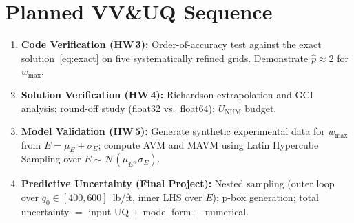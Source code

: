 \documentclass[11pt,letterpaper]{article}
\begin{document}
\section{Planned VV\&UQ Sequence}
\label{sec:plan}

\begin{enumerate}
  \item \textbf{Code Verification (HW\,3):} Order-of-accuracy test against the
    exact solution~\eqref{eq:exact} on five systematically refined grids.
    Demonstrate $\hat{p} \approx 2$ for $w_{\max}$.
  \item \textbf{Solution Verification (HW\,4):} Richardson extrapolation and GCI
    analysis; round-off study (float32 vs.\ float64); $U_{\mathrm{NUM}}$ budget.
  \item \textbf{Model Validation (HW\,5):} Generate synthetic experimental data
    for $w_{\max}$ from $E = \mu_E \pm \sigma_E$; compute AVM and MAVM using
    Latin Hypercube Sampling over $E \sim \mathcal{N}(\mu_E, \sigma_E)$.
  \item \textbf{Predictive Uncertainty (Final Project):} Nested sampling (outer
    loop over $q_0 \in [400, 600]$~lb/ft, inner LHS over $E$); p-box
    generation; total uncertainty $=$ input UQ $+$ model form $+$ numerical.
\end{enumerate}
\end{document}
